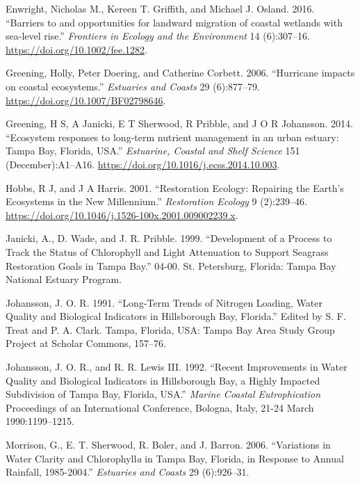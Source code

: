 \documentclass[]{article}
\begin{document}
\leavevmode\hypertarget{ref-Enwright16}{}%
Enwright, Nicholas M., Kereen T. Griffith, and Michael J. Osland. 2016.
``Barriers to and opportunities for landward migration of coastal
wetlands with sea-level rise.'' \emph{Frontiers in Ecology and the
Environment} 14 (6):307--16. \url{https://doi.org/10.1002/fee.1282}.

\leavevmode\hypertarget{ref-Greening06b}{}%
Greening, Holly, Peter Doering, and Catherine Corbett. 2006. ``Hurricane
impacts on coastal ecosystems.'' \emph{Estuaries and Coasts} 29
(6):877--79. \url{https://doi.org/10.1007/BF02798646}.

\leavevmode\hypertarget{ref-Greening2014}{}%
Greening, H S, A Janicki, E T Sherwood, R Pribble, and J O R Johansson.
2014. ``Ecosystem responses to long-term nutrient management in an urban
estuary: Tampa Bay, Florida, USA.'' \emph{Estuarine, Coastal and Shelf
Science} 151 (December):A1--A16.
\url{https://doi.org/10.1016/j.ecss.2014.10.003}.

\leavevmode\hypertarget{ref-Hobbs01}{}%
Hobbs, R J, and J A Harris. 2001. ``Restoration Ecology: Repairing the
Earth's Ecosystems in the New Millennium.'' \emph{Restoration Ecology} 9
(2):239--46. \url{https://doi.org/10.1046/j.1526-100x.2001.009002239.x}.

\leavevmode\hypertarget{ref-Janicki99}{}%
Janicki, A., D. Wade, and J. R. Pribble. 1999. ``Development of a
Process to Track the Status of Chlorophyll and Light Attenuation to
Support Seagrass Restoration Goals in Tampa Bay.'' 04-00. St.
Petersburg, Florida: Tampa Bay National Estuary Program.

\leavevmode\hypertarget{ref-Johansson91}{}%
Johansson, J. O. R. 1991. ``Long-Term Trends of Nitrogen Loading, Water
Quality and Biological Indicators in Hillsborough Bay, Florida.'' Edited
by S. F. Treat and P. A. Clark. Tampa, Florida, USA: Tampa Bay Area
Study Group Project at Scholar Commons, 157--76.

\leavevmode\hypertarget{ref-Johansson92}{}%
Johansson, J. O. R., and R. R. Lewis III. 1992. ``Recent Improvements in
Water Quality and Biological Indicators in Hillsborough Bay, a Highly
Impacted Subdivision of Tampa Bay, Florida, USA.'' \emph{Marine Coastal
Eutrophication} Proceedings of an International Conference, Bologna,
Italy, 21-24 March 1990:1199--1215.

\leavevmode\hypertarget{ref-Morrison06}{}%
Morrison, G., E. T. Sherwood, R. Boler, and J. Barron. 2006.
``Variations in Water Clarity and Chlorophyll\emph{a} in Tampa Bay,
Florida, in Response to Annual Rainfall, 1985-2004.'' \emph{Estuaries
and Coasts} 29 (6):926--31.
\end{document}
